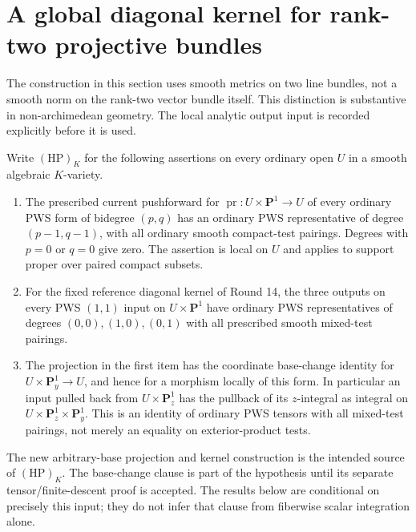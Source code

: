 \section{A global diagonal kernel for rank-two projective bundles}
\label{r15b:rank-two-section}

The construction in this section uses smooth metrics on two line
bundles, not a smooth norm on the rank-two vector bundle itself.
This distinction is substantive in non-archimedean geometry.
The local analytic output input is recorded explicitly before it
is used.

\begin{definition}
\label{r15b:HP}
Write $(\mathrm{HP})_K$ for the following assertions on every
ordinary open $U$ in a smooth algebraic $K$-variety.
\begin{enumerate}
\item The prescribed current pushforward for
$\operatorname{pr}:U\times\mathbf P^1\to U$ of every ordinary
PWS form of bidegree $(p,q)$ has an ordinary PWS representative
of degree $(p-1,q-1)$, with all ordinary smooth compact-test
pairings. Degrees with $p=0$ or $q=0$ give zero. The assertion
is local on $U$ and applies to support proper over paired
compact subsets.
\item For the fixed reference diagonal kernel of Round 14,
the three outputs on every PWS $(1,1)$ input on
$U\times\mathbf P^1$ have ordinary PWS representatives of
degrees $(0,0),(1,0),(0,1)$ with all prescribed smooth mixed-test
pairings.
\item The projection in the first item has the coordinate
base-change identity for
$U\times\mathbf P^1_y\to U$, and hence for a morphism locally
of this form. In particular an input pulled back from
$U\times\mathbf P^1_z$ has the pullback of its $z$-integral
as integral on $U\times\mathbf P^1_z\times\mathbf P^1_y$.
This is an identity of ordinary PWS tensors with all mixed-test
pairings, not merely an equality on exterior-product tests.
\end{enumerate}
\end{definition}

The new arbitrary-base projection and kernel construction is the
intended source of $(\mathrm{HP})_K$. The base-change clause is
part of the hypothesis until its separate tensor/finite-descent
proof is accepted. The results below are conditional on precisely
this input; they do not infer that clause from fiberwise scalar
integration alone.

